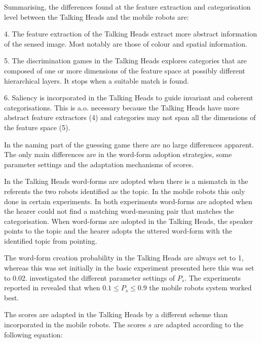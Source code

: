 Summarising, the differences found at the feature extraction and categorisation level between the Talking Heads and the mobile robots are:

\begin{description}
\item 4. The feature extraction of the Talking Heads extract more abstract information of the sensed image. Most notably are those of colour and spatial information.
\item 5. The discrimination games in the Talking Heads explores categories that are composed of one or more dimensions of the feature space at possibly different hierarchical layers. It stops when a suitable match is found.
\item 6. Saliency is incorporated in the Talking Heads to guide invariant and coherent categorisations. This is a.o. necessary because the Talking Heads have more abstract feature extractors (4) and categories may not span all the dimensions of the feature space (5).
\end{description}

In the naming part of the guessing game there are no large differences apparent. The only main differences are in the word-form adoption strategies, some parameter settings and the adaptation mechanisms of scores.

In the Talking Heads word-forms are adopted when there is a mismatch in the referents the two robots identified as the topic. In the mobile robots this only done in certain experiments. In both experiments word-forms are adopted when the hearer could not find a matching word-meaning pair that matches the categorisation. When word-forms are adopted in the Talking Heads, the speaker points to the topic and the hearer adopts the uttered word-form with the identified topic from pointing.

The word-form creation probability in the Talking Heads are always set to 1, whereas this was set initially in the basic experiment presented here this was set to 0.02. \citet{kaplan:2000} investigated the different parameter settings of $P_s$. The experiments reported in  revealed that when $0.1 \leq P_s\leq 0.9$ the mobile robots system worked best.

The scores are adapted in the Talking Heads by a different scheme than incorporated in the mobile robots. The scores $s$ are adapted according to the following equation:

